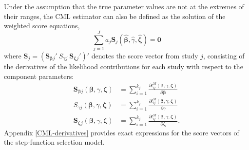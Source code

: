 \documentclass[
  man, donotrepeattitle,floatsintext]{apa7}
\begin{document}
Under the assumption that the true parameter values are not at the extremes of their ranges, the CML estimator can also be defined as the solution of the weighted score equations,
\begin{equation}
\sum_{j=1}^J a_j \mathbf{S}_{j}\left(\boldsymbol{\hat\beta}, \hat\gamma, \boldsymbol{\hat\zeta}\right) = \mathbf{0}
\end{equation}
where \(\mathbf{S}_j = \left(\mathbf{S}_{\boldsymbol\beta j}' \  S_{\gamma j} \ \mathbf{S}_{\boldsymbol\zeta j}'\right)'\) denotes the score vector from study \(j\), consisting of the derivatives of the likelihood contributions for each study with respect to the component parameters:
\begin{align}
\mathbf{S}_{\boldsymbol\beta j}\left(\boldsymbol{\beta}, \gamma, \boldsymbol{\zeta}\right) &= \sum_{i=1}^{k_j} \frac{\partial l^M_{ij}\left(\boldsymbol\beta, \gamma, \boldsymbol\zeta\right)}{\partial \boldsymbol\beta} \label{eq:score-M-beta} \\
S_{\gamma j}\left(\boldsymbol{\beta}, \gamma, \boldsymbol{\zeta}\right) &= \sum_{i=1}^{k_j}\frac{\partial l^M_{ij}\left(\boldsymbol\beta, \gamma, \boldsymbol\zeta\right)}{\partial \gamma} \label{eq:score-M-gamma} \\
\mathbf{S}_{\boldsymbol\zeta j}\left(\boldsymbol{\beta}, \gamma, \boldsymbol{\zeta}\right) &= \sum_{i=1}^{k_j} \frac{\partial l^M_{ij}\left(\boldsymbol\beta, \gamma, \boldsymbol\zeta\right)}{\partial \boldsymbol\zeta}. \label{eq:score-M-zeta} 
\end{align}
Appendix \ref{CML-derivatives} provides exact expressions for the score vectors of the step-function selection model.
\end{document}
